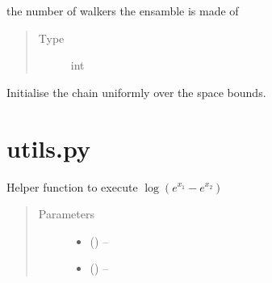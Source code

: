 \documentclass[letterpaper,10pt,english,openany,oneside]{sphinxmanual}
\begin{document}
\begin{fulllineitems}
\begin{fulllineitems}
\label{\detokenize{autogen:samplers.Sampler.nwalkers}}
the number of walkers the ensamble is made of
\begin{quote}\begin{description}
\item[{Type}] \leavevmode
int

\end{description}\end{quote}

\end{fulllineitems}


\begin{fulllineitems}
\label{\detokenize{autogen:samplers.Sampler.__init__}}
Initialise the chain uniformly over the space bounds.

\end{fulllineitems}


\end{fulllineitems}



\section{utils.py}
\label{\detokenize{autogen:module-utils}}\label{\detokenize{autogen:utils-py}}

\begin{fulllineitems}
\label{\detokenize{autogen:utils.logsubexp}}
Helper function to execute \(\log{(e^{x_1} - e^{x_2})}\)
\begin{quote}\begin{description}
\item[{Parameters}] \leavevmode\begin{itemize}
\item {} 
 () – 

\item {} 
 () – 

\end{itemize}

\end{description}\end{quote}

\end{fulllineitems}
\end{document}
